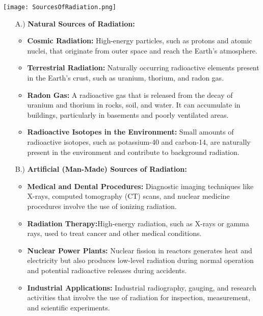 \documentclass[../../Report.tex]{subfiles}
\begin{document}
        \begin{Figure}
            \centering
            \texttt{[image: SourcesOfRadiation.png]}
            \label{fig:SourcesOfRadiation}
        \end{Figure}

        \begin{enumerate}
            \item[A.)] \textbf{Natural Sources of Radiation:}
            \begin{itemize}
                \item \textbf{Cosmic Radiation:} High-energy particles, such as protons and atomic nuclei, that originate from outer space 
                and reach the Earth's atmosphere.

                \item \textbf{Terrestrial Radiation:} Naturally occurring radioactive elements present in the Earth's crust, such as uranium, 
                thorium, and radon gas.

                \item \textbf{Radon Gas:} A radioactive gas that is released from the decay of uranium and thorium in rocks, soil, 
                and water. It can accumulate in buildings, particularly in basements and poorly ventilated areas.

                \item \textbf{Radioactive Isotopes in the Environment:} Small amounts of radioactive isotopes, 
                such as potassium-40 and carbon-14, are naturally present in the environment and contribute to background radiation.

            \end{itemize} 

            \item[B.)] \textbf{Artificial (Man-Made) Sources of Radiation:}
            \begin{itemize}
                \item \textbf{Medical and Dental Procedures:} Diagnostic imaging techniques 
                like X-rays, computed tomography (CT) scans, and nuclear medicine procedures involve the use of ionizing radiation.

                \item \textbf{Radiation Therapy:}High-energy radiation, such as X-rays or gamma rays, used to treat cancer and other medical conditions.

                \item \textbf{Nuclear Power Plants:} Nuclear fission in reactors generates heat and electricity but also produces low-level radiation 
                during normal operation and potential radioactive releases during accidents.

                \item \textbf{Industrial Applications:} Industrial radiography, gauging, and research activities that involve the use of radiation 
                for inspection, measurement, and scientific experiments.
            \end{itemize}
        \end{enumerate}
\end{document}
